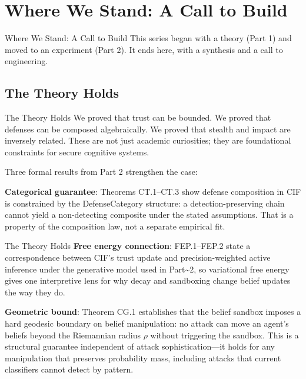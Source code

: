 \documentclass[
  ignorenonframetext,
]{beamer}
\author{\texorpdfstring{}{}}
\date{}
\begin{document}
\begin{frame}
\newpage
\end{frame}

\section{Where We Stand: A Call to Build}\label{sec:conclusion}

\begin{frame}[allowframebreaks]{Where We Stand: A Call to Build}
This series began with a theory (Part 1) and moved to an experiment
(Part 2). It ends here, with a synthesis and a call to engineering.
\end{frame}

\subsection{The Theory Holds}\label{the-theory-holds}

\begin{frame}[allowframebreaks]{The Theory Holds}
We proved that trust can be bounded. We proved that defenses can be
composed algebraically. We proved that stealth and impact are inversely
related. These are not just academic curiosities; they are foundational
constraints for secure cognitive systems.

Three formal results from Part 2 strengthen the case:

\textbf{Categorical guarantee}: Theorems CT.1--CT.3 show defense
composition in CIF is constrained by the DefenseCategory structure: a
detection-preserving chain cannot yield a non-detecting composite under
the stated assumptions. That is a property of the composition law, not a
separate empirical fit.

\end{frame}

\begin{frame}[allowframebreaks]{The Theory Holds}
\textbf{Free energy connection}: FEP.1--FEP.2 state a correspondence
between CIF's trust update and precision-weighted active inference under
the generative model used in Part\textasciitilde2, so variational free
energy gives one interpretive lens for why decay and sandboxing change
belief updates the way they do.

\textbf{Geometric bound}: Theorem CG.1 establishes that the belief
sandbox imposes a hard geodesic boundary on belief manipulation: no
attack can move an agent's beliefs beyond the Riemannian radius \(\rho\)
without triggering the sandbox. This is a structural guarantee
independent of attack sophistication---it holds for any manipulation
that preserves probability mass, including attacks that current
classifiers cannot detect by pattern.
\end{frame}
\end{document}
